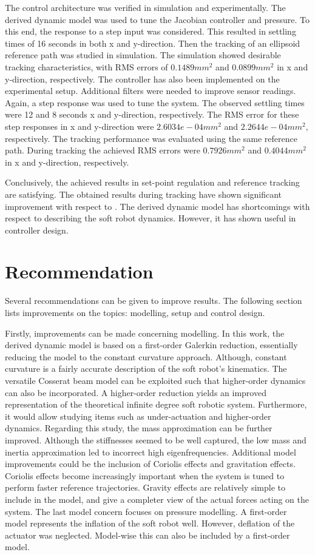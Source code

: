 The control architecture was verified in simulation and experimentally. The derived dynamic model was used to tune the Jacobian controller and pressure. To this end, the response to a step input was considered. This resulted in settling times of 16 seconds in both x and y-direction. Then the tracking of an ellipsoid reference path was studied in simulation. The simulation showed desirable tracking characteristics, with RMS errors of $0.1489 mm^2$ and $0.0899 mm^2$ in x and y-direction, respectively. The controller has also been implemented on the experimental setup. Additional filters were needed to improve sensor readings. Again, a step response was used to tune the system. The observed settling times were 12 and 8 seconds x and y-direction, respectively. The RMS error for these step responses in x and y-direction were $2.6034e-04 mm^2$ and $2.2644e-04 mm^2$, respectively. The tracking performance was evaluated using the same reference path. During tracking the achieved RMS errors were $0.7926 mm^2$ and $0.4044 mm^2$ in x and y-direction, respectively. 

Conclusively, the achieved results in set-point regulation and reference tracking are satisfying. The obtained results during tracking have shown significant improvement with respect to \cite{berkers}. The derived dynamic model has shortcomings with respect to describing the soft robot dynamics. However, it has shown useful in controller design.

\section{Recommendation}

Several recommendations can be given to improve results. The following section lists improvements on the topics: modelling, setup and control design.

Firstly, improvements can be made concerning modelling. In this work, the derived dynamic model is based on a first-order Galerkin reduction, essentially reducing the model to the constant curvature approach. Although, constant curvature is a fairly accurate description of the soft robot's kinematics. The versatile Cosserat beam model can be exploited such that higher-order dynamics can also be incorporated. A higher-order reduction yields an improved representation of the theoretical infinite degree soft robotic system. Furthermore, it would allow studying items such as under-actuation and higher-order dynamics. Regarding this study, the mass approximation can be further improved. Although the stiffnesses seemed to be well captured, the low mass and inertia approximation led to incorrect high eigenfrequencies. Additional model improvements could be the inclusion of Coriolis effects and gravitation effects. Coriolis effects become increasingly important when the system is tuned to perform faster reference trajectories. Gravity effects are relatively simple to include in the model, and give a completer view of the actual forces acting on the system. The last model concern focuses on pressure modelling. A first-order model represents the inflation of the soft robot well. However, deflation of the actuator was neglected. Model-wise this can also be included by a first-order model. 


